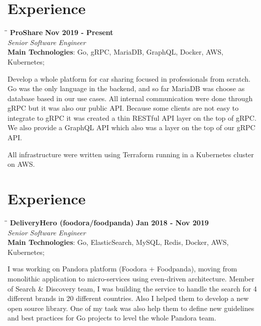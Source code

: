 \documentclass[margin]{res}
\begin{document}
\begin{resume}
\section{Experience}
\vspace{-0.1in}
    \begin{tabbing}
    \hspace{2.3in}\= \hspace{1.7in}\= \kill %
    \textbf{ProShare}    \>\>\textbf{Nov 2019 - Present}\\
    \textit{Senior Software Engineer}\\
    \textbf{Main Technologies}: Go, gRPC, MariaDB, GraphQL, Docker, AWS, Kubernetes;
    \end{tabbing}\vspace{-20pt}      %
    \vspace{2mm}
Develop a whole platform for car sharing focused in professionals from scratch. Go was the only language in the backend, and so far MariaDB was choose as database based in our use cases. All internal communication were done through gRPC but it was also our public API. Because some clients are not easy to integrate to gRPC it was created a thin RESTful API layer on the top of gRPC. We also provide a GraphQL API which also was a layer on the top of our gRPC API.

All infrastructure were written using Terraform running in a Kubernetes cluster on AWS.

\section{Experience}
\vspace{-0.1in}
    \begin{tabbing}
    \hspace{2.3in}\= \hspace{1.7in}\= \kill %
    \textbf{DeliveryHero (foodora/foodpanda)}    \>\>\textbf{Jan 2018 - Nov 2019}\\
    \textit{Senior Software Engineer}\\
    \textbf{Main Technologies}: Go, ElasticSearch, MySQL, Redis, Docker, AWS, Kubernetes;
    \end{tabbing}\vspace{-20pt}      %
    \vspace{2mm}
I was working on Pandora platform (Foodora + Foodpanda), moving from monolithic application to micro-services using even-driven architecture. Member of Search \& Discovery team, I was building the service to handle the search for 4 different brands in 20 different countries.
Also I helped them to develop a new open source library. One of my task was also help them to define new guidelines and best practices for Go projects to level the whole Pandora team.


\end{resume}
\end{document}
